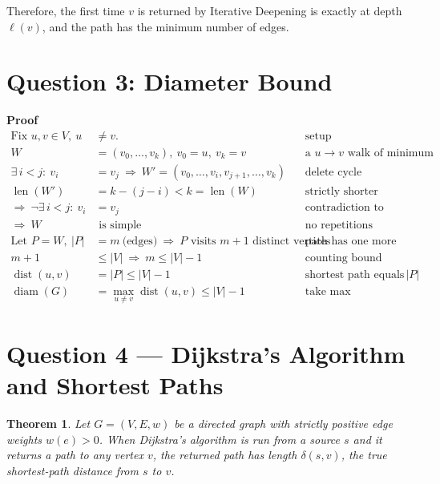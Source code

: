 \documentclass[11pt]{article}
\newtheorem{theorem}{Theorem}
\theoremstyle{definition}
\theoremstyle{remark}
\begin{document}
Therefore, the first time $v$ is returned by Iterative Deepening is exactly at depth $\ell(v)$, and the path has the minimum number of edges.


\section*{Question 3: Diameter Bound}

\noindent\textbf{Proof}\\
\begin{align*}
\text{Fix }u,v\in V,\ u&\neq v. &\text{setup}\\
W &= (v_0,\ldots,v_k),\ v_0=u,\ v_k=v &\text{a $u\!\to\! v$ walk of minimum length}\\
\exists\, i<j:\ v_i&=v_j \ \Rightarrow\ W'=(v_0,\ldots,v_i,v_{j+1},\ldots,v_k) &\text{delete cycle}\\
\operatorname{len}(W')&=k-(j-i) < k=\operatorname{len}(W) &\text{strictly shorter}\\
\Rightarrow\ \neg\exists\, i<j:\ v_i&=v_j &\text{contradiction to minimality}\\
\Rightarrow\ W&\text{ is simple} &\text{no repetitions}\\[3pt]
\text{Let }P=W,\ |P|&=m\ \text{(edges)} \ \Rightarrow\ \text{$P$ visits }m+1\text{ distinct vertices} &\text{path has one more vertex}\\
m+1 &\le |V| \ \Rightarrow\ m\le |V|-1 &\text{counting bound}\\
\operatorname{dist}(u,v) &= |P| \le |V|-1 &\text{shortest path equals $|P|$}\\
\operatorname{diam}(G) &= \max_{u\neq v}\operatorname{dist}(u,v) \le |V|-1 &\text{take max}
\end{align*}



\section*{Question 4 — Dijkstra’s Algorithm and Shortest Paths}

\begin{theorem}
Let $G=(V,E,w)$ be a directed graph with strictly positive edge weights $w(e)>0$. When Dijkstra’s algorithm is run from a source $s$ and it returns a path to any vertex $v$, the returned path has length $\delta(s,v)$, the true shortest-path distance from $s$ to $v$.
\end{theorem}
\end{document}
